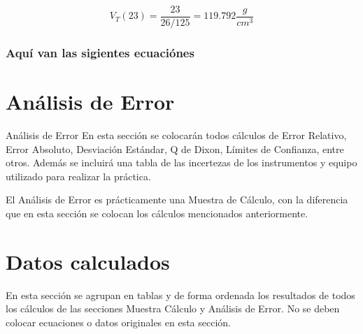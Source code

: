 \documentclass[osajnl,onecolumn,showpacs,superscriptaddress,12pt]{revtex4-1}
\begin{document}
\[V_{T} (23) = \dfrac{23}{26/125} = 119.792 \dfrac{g}{cm^{3}}\]

\clearpage


\subsubsection{Aquí van las sigientes ecuaciónes}






\section{Análisis de Error}

Análisis de Error En esta sección se colocarán todos cálculos de Error Relativo, Error Absoluto, Desviación Estándar, Q de Dixon, Límites de Confianza, entre otros. Además se incluirá una tabla de las incertezas de los instrumentos y equipo utilizado para realizar la práctica.\

El Análisis de Error es prácticamente una Muestra de Cálculo, con la diferencia que en esta sección se colocan los cálculos mencionados anteriormente.


\section{Datos calculados}

En esta sección se agrupan en tablas y de forma ordenada los resultados de todos los cálculos de las secciones Muestra Cálculo y Análisis de Error. No se deben colocar ecuaciones o datos originales en esta sección.
\end{document}
